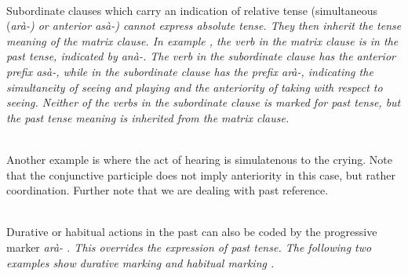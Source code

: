  \\
Subordinate clauses which carry an indication of relative tense (simultaneous (\em arà-\em) or anterior \em asà-\em) cannot express absolute tense. They then inherit the tense meaning of the matrix clause. In example , the verb  in the matrix clause is in the past tense, indicated by \em anà-\em. The verb  in the subordinate clause has the anterior prefix \em asà-\em, while  in the subordinate clause has the prefix \em arà-\em, indicating the simultaneity of seeing and playing and the anteriority of taking with respect to seeing. Neither of the verbs in the subordinate clause is marked for past tense, but the past tense meaning is inherited from the matrix clause.

\\


Another example is  where the act of hearing is simulatenous to the crying. Note that the conjunctive participle does not imply anteriority in this case, but rather coordination. Further note that we are dealing with past reference.

\\


Durative or habitual actions in the past can also be coded by the progressive marker \em arà- \em. This overrides the expression of past tense. The following two examples show durative marking  and habitual marking .

